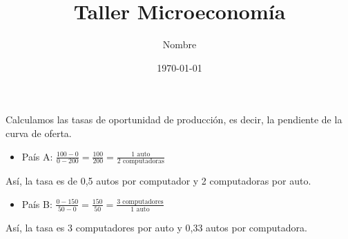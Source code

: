 \documentclass[11pt,a4paper]{article} %
\title{Taller Microeconomía} %
\author{Nombre} %
\date{\today} %
\begin{document}

\maketitle\thispagestyle{fancy} %


\section{}


\subsection{}

\noindent Calculamos las tasas de oportunidad de producción, es decir, la pendiente de la curva de oferta. 

\begin{itemize}
\item País A: $\frac{100-0}{0-200} = \frac{100}{200} = \frac{\text{1 auto}}{\text{2 computadoras}}$
\end{itemize}

\noindent Así, la tasa es de 0,5 autos por computador y 2 computadoras por auto.


\begin{itemize}
    \item País B: $\frac{0-150}{50-0} = \frac{150}{50} = \frac{\text{3 computadores}}{\text{1 auto}}$
\end{itemize}

\noindent Así, la tasa es 3 computadores por auto y 0,33 autos por computadora.

\subsection{}

\end{document}
